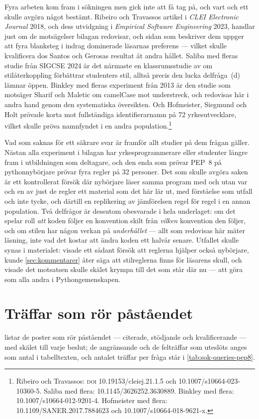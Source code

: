 Fyra arbeten kom fram i sökningen men gick inte att få tag på, och vart
och ett skulle avgöra något bestämt.  Ribeiro och Travassos artikel i
\emph{CLEI Electronic Journal} 2018, och dess utvidgning i
\emph{Empirical Software Engineering} 2023, handlar just om de
motsägelser bilagan redovisar, och sidan som beskriver dem uppger att
fyra blanksteg i indrag dominerade läsarnas preferens --- vilket skulle
kvalificera dos Santos och Gerosas resultat åt andra hållet.  Saliba med
fleras studie från SIGCSE 2024 är det närmaste en klassrumsstudie av om
stilåterkoppling förbättrar studenters stil, alltså precis den lucka
delfråga~(d) lämnar öppen.  Binkley med fleras experiment från 2013 är
den studie som motsäger Sharif och Maletic om
\foreignlanguage{english}{camelCase} mot understreck, och redovisas här
i andra hand genom den systematiska översikten.  Och Hofmeister,
Siegmund och Holt prövade korta mot fullständiga identifierarnamn på 72
yrkesutvecklare, vilket skulle pröva namnfyndet i en andra
population.\footnote{Ribeiro och Travassos: \textsc{doi}
  10.19153/cleiej.21.1.5 och 10.1007/s10664-023-10360-5.  Saliba med
  flera: 10.1145/3626252.3630889.  Binkley med flera:
  10.1007/s10664-012-9201-4.  Hofmeister med flera:
  10.1109/SANER.2017.7884623 och 10.1007/s10664-018-9621-x.}

Vad som saknas för ett säkrare svar är framför allt studier på dem
frågan gäller.  Nästan alla experiment i bilagan har yrkesprogrammerare
eller studenter längre fram i utbildningen som deltagare, och den enda
som prövar PEP~8 på pythonnybörjare prövar fyra regler på 32
personer.  Det som skulle avgöra saken är ett kontrollerat försök där
nybörjare läser samma program med och utan var och en av just de regler
ett material som det här lär ut, med förståelse som utfall och inte
tycke, och därtill en replikering av jämförelsen regel för regel i en
annan population.  Två delfrågor är dessutom obesvarade i hela
underlaget: om det spelar roll \emph{att} koden följer en konvention
skilt från \emph{vilken} konvention den följer, och om stilen har någon
verkan på \emph{underhållet} --- allt som redovisas här mäter läsning,
inte vad det kostar att ändra koden ett halvår senare.  Utfallet skulle
synas i materialet: visade ett sådant försök att reglerna hjälper också
nybörjare, kunde \cref{sec:kommentarer} åter säga att stilreglerna finns
för läsarens skull, och visade det motsatsen skulle skälet krympa till
det som står där nu --- att göra som alla andra i Pythongemenskapen.

\section{Träffar som rör påståendet}
\label{sec:pep8-traffar}

 listar de poster som rör påståendet --- citerade,
stödjande och kvalificerande --- med skälet till varje beslut; de
angränsande och de felträffar som uteslöts anges som antal i
tabelltexten, och antalet träffar per fråga står i
\cref{tab:sok-queries-pep8}.

